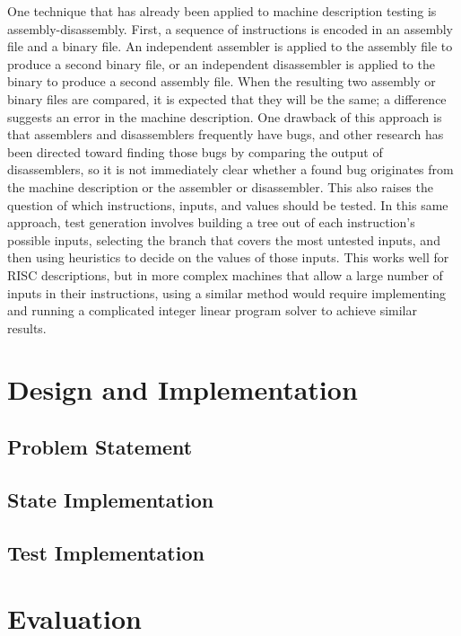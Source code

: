 \documentclass[letterpaper,12pt]{article}
\begin{document}
One technique that has already been applied to machine description testing is assembly-disassembly. First, a sequence of instructions is encoded in an assembly file and a binary file. An independent assembler is applied to the assembly file to produce a second binary file, or an independent disassembler is applied to the binary to produce a second assembly file. When the resulting two assembly or binary files are compared, it is expected that they will be the same; a difference suggests an error in the machine description. One drawback of this approach is that assemblers and disassemblers frequently have bugs, and other research has been directed toward finding those bugs by comparing the output of disassemblers, so it is not immediately clear whether a found bug originates from the machine description or the assembler or disassembler. This also raises the question of which instructions, inputs, and values should be tested. In this same approach, test generation involves building a tree out of each instruction's possible inputs, selecting the branch that covers the most untested inputs, and then using heuristics to decide on the values of those inputs. This works well for RISC descriptions, but in more complex machines that allow a large number of inputs in their instructions, using a similar method would require implementing and running a complicated integer linear program solver to achieve similar results.

\section{Design and Implementation}

\subsection{Problem Statement}

\subsection{State Implementation}

\subsection{Test Implementation}

\section{Evaluation}
\end{document}
